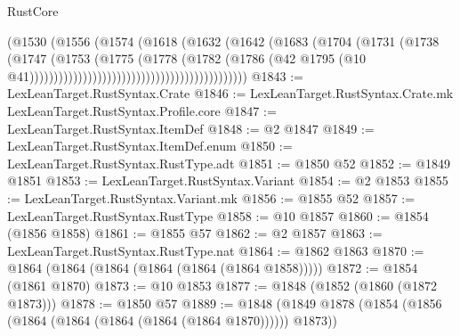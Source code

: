 \begin{lexlean}{RustCore}
\begin{coremodule}
                                                          (@1530
                                                            (@1556
                                                              (@1574
                                                                (@1618
                                                                  (@1632
                                                                    (@1642
                                                                      (@1683
                                                                        (@1704
                                                                          (@1731
                                                                            (@1738
                                                                              (@1747
                                                                                (@1753
                                                                                  (@1775
                                                                                    (@1778
                                                                                      (@1782
                                                                                        (@1786
                                                                                          (@42
                                                                                            @1795
                                                                                            (@10
                                                                                              @41)))))))))))))))))))))))))))))))))))))))))))))
@1843 := LexLeanTarget.RustSyntax.Crate
@1846 := LexLeanTarget.RustSyntax.Crate.mk LexLeanTarget.RustSyntax.Profile.core
@1847 := LexLeanTarget.RustSyntax.ItemDef
@1848 := @2 @1847
@1849 := LexLeanTarget.RustSyntax.ItemDef.enum
@1850 := LexLeanTarget.RustSyntax.RustType.adt
@1851 := @1850 @52
@1852 := @1849 @1851
@1853 := LexLeanTarget.RustSyntax.Variant
@1854 := @2 @1853
@1855 := LexLeanTarget.RustSyntax.Variant.mk
@1856 := @1855 @52
@1857 := LexLeanTarget.RustSyntax.RustType
@1858 := @10 @1857
@1860 := @1854 (@1856 @1858)
@1861 := @1855 @57
@1862 := @2 @1857
@1863 := LexLeanTarget.RustSyntax.RustType.nat
@1864 := @1862 @1863
@1870 := @1864 (@1864 (@1864 (@1864 (@1864 (@1864 @1858)))))
@1872 := @1854 (@1861 @1870)
@1873 := @10 @1853
@1877 := @1848 (@1852 (@1860 (@1872 @1873)))
@1878 := @1850 @57
@1889 := @1848 (@1849 @1878 (@1854 (@1856 (@1864 (@1864 (@1864 (@1864 (@1864 @1870)))))) @1873))

\end{coremodule}
\end{lexlean}
